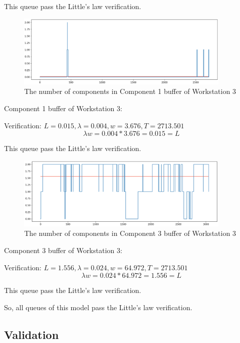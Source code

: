 \documentclass{article}
\begin{document}
This queue pass the Little's law verification.

\begin{figure}[htbp]
\begin{center}
\includegraphics[width=4in]{W3_C1B.png}
\caption{The number of components in Component 1 buffer of Workstation 3}
\label{W3_C1B}
\end{center}
\end{figure}

Component 1 buffer of Workstation 3:

Verification: $L = 0.015, \lambda = 0.004, w = 3.676, T = 2713.501$
\begin{equation}
\lambda w = 0.004*3.676 = 0.015 = L
\end{equation}

This queue pass the Little's law verification.

\begin{figure}[htbp]
\begin{center}
\includegraphics[width=4in]{W3_C3B.png}
\caption{The number of components in Component 3 buffer of Workstation 3}
\label{W3_C3B}
\end{center}
\end{figure}

Component 3 buffer of Workstation 3:

Verification: $L = 1.556, \lambda = 0.024, w = 64.972, T = 2713.501$
\begin{equation}
\lambda w = 0.024*64.972 = 1.556 = L
\end{equation}

This queue pass the Little's law verification.

So, all queues of this model pass the Little's law verification.

\subsection{Validation}
\end{document}
